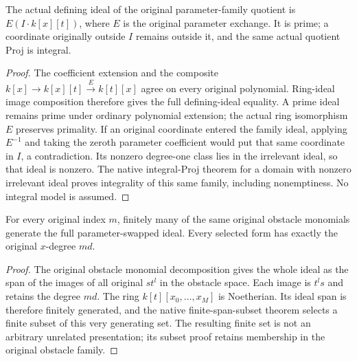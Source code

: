 \begin{lemma}
\label{lem:c0n-original-family-integral}
\leanok
{}
The actual defining ideal of the original parameter-family quotient is
$E(I\cdot k[x][t])$, where $E$ is the original parameter exchange. It is prime;
a coordinate originally outside $I$ remains outside it, and the same actual
quotient Proj is integral.
\end{lemma}
\begin{proof}
The coefficient extension and the composite $k[x]\to k[x][t]\xrightarrow E
k[t][x]$ agree on every original polynomial. Ring-ideal image composition
therefore gives the full defining-ideal equality. A prime ideal remains prime
under ordinary polynomial extension; the actual ring isomorphism $E$ preserves
primality. If an original coordinate entered the family ideal, applying
$E^{-1}$ and taking the zeroth parameter coefficient would put that same
coordinate in $I$, a contradiction. Its nonzero degree-one class lies in the
irrelevant ideal, so that ideal is nonzero. The native integral-Proj theorem
for a domain with nonzero irrelevant ideal proves integrality of this same
family, including nonemptiness. No integral model is assumed.
\end{proof}

\begin{lemma}
\label{lem:c0n-original-finite-obstacle-forms}
\leanok
{}
For every original index $m$, finitely many of the same original obstacle
monomials generate the full parameter-swapped ideal. Every selected form has
exactly the original $x$-degree $md$.
\end{lemma}
\begin{proof}
The original obstacle monomial decomposition gives the whole ideal as the span
of the images of all original $s t^l$ in the obstacle space. Each image is
$t^l s$ and retains the degree $md$. The ring $k[t][x_0,\ldots,x_M]$ is
Noetherian. Its ideal span is therefore finitely generated, and the native
finite-span-subset theorem selects a finite subset of this very generating
set. The resulting finite set is not an arbitrary unrelated presentation;
its subset proof retains membership in the original obstacle family.
\end{proof}

